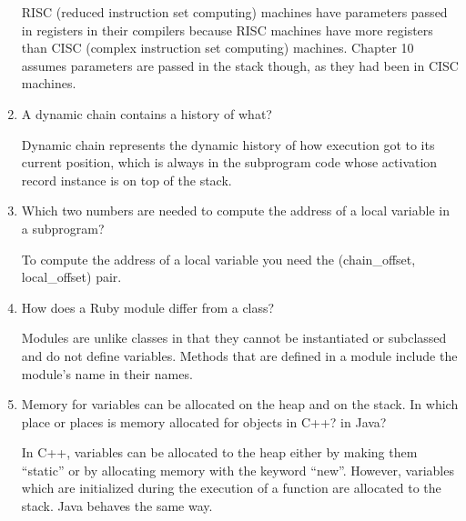\begin{enumerate}
  \begin{answer}

    RISC (reduced instruction set computing) machines
    have parameters passed in registers in their
    compilers because RISC machines have more registers
    than CISC (complex instruction set computing)
    machines. Chapter 10 assumes parameters are passed
    in the stack though, as they had been in CISC
    machines.

  \end{answer}

  \item A dynamic chain contains a history of what?

  \begin{answer}

    Dynamic chain represents the dynamic history of how
    execution got to its current position, which is
    always in the subprogram code whose activation
    record instance is on top of the stack.

  \end{answer}

  \item Which two numbers are needed to compute
    the address of a local variable in a subprogram?

  \begin{answer}

    To compute the address of a local variable you need
    the (chain_offset, local_offset) pair.

  \end{answer}

  \item How does a Ruby module differ from a class?

  \begin{answer}

    Modules are unlike classes in that they cannot be
    instantiated or subclassed and do not define
    variables. Methods that are defined in a module
    include the module’s name in their names.

  \end{answer}

  \item Memory for variables can be allocated on the heap
    and on the stack. In which place or places is memory
    allocated for objects in C++? in Java?

  \begin{answer}

    In C++, variables can be allocated to the heap either
    by making them “static” or by allocating memory with
    the keyword “new”. However, variables which are
    initialized during the execution of a function are
    allocated to the stack. Java behaves the same way.


\end{answer}
\end{enumerate}
